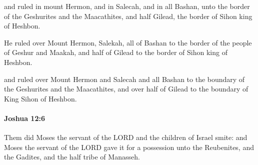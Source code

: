 			\begin{versebox}
					\item[BHS] 
					\item[ASV] and ruled in mount Hermon, and in Salecah, and in all Bashan, unto the border of the Geshurites and the Maacathites, and half Gilead, the border of Sihon king of Heshbon.
					\item[NIV] He ruled over Mount Hermon, Salekah, all of Bashan to the border of the people of Geshur and Maakah, and half of Gilead to the border of Sihon king of Heshbon.
					\item[NRSV] and ruled over Mount Hermon and Salecah and all Bashan to the boundary of the Geshurites and the Maacathites, and over half of Gilead to the boundary of King Sihon of Heshbon.
			\end{versebox}

		\paragraph{Joshua 12:6} %
			\label{JOSHUA-12-6}

			Them did Moses the servant of the LORD and the children of Israel smite: and Moses the servant of the LORD gave it for a possession unto the Reubenites, and the Gadites, and the half tribe of Manasseh.

